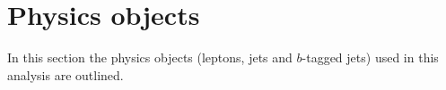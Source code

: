 


\section{Physics objects}
In this section the physics objects (leptons, jets and $b$-tagged jets) used in this analysis are outlined.
